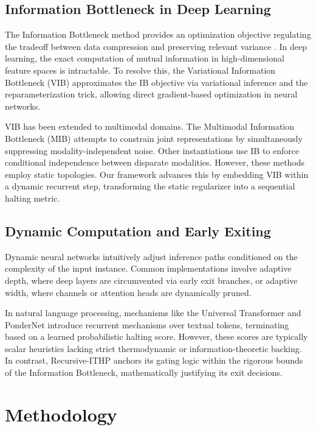 \documentclass[11pt]{article}
\begin{document}
\subsection{Information Bottleneck in Deep Learning}
The Information Bottleneck method provides an optimization objective regulating the tradeoff between data compression and preserving relevant variance \citep{tishby1999information, tishby2015deep}. In deep learning, the exact computation of mutual information in high-dimensional feature spaces is intractable. To resolve this, the Variational Information Bottleneck (VIB) \citep{alemi2016deep} approximates the IB objective via variational inference and the reparameterization trick, allowing direct gradient-based optimization in neural networks.

VIB has been extended to multimodal domains. The Multimodal Information Bottleneck (MIB) attempts to constrain joint representations by simultaneously suppressing modality-independent noise. Other instantiations use IB to enforce conditional independence between disparate modalities. However, these methods employ static topologies. Our framework advances this by embedding VIB within a dynamic recurrent step, transforming the static regularizer into a sequential halting metric.

\subsection{Dynamic Computation and Early Exiting}
Dynamic neural networks intuitively adjust inference paths conditioned on the complexity of the input instance. Common implementations involve adaptive depth, where deep layers are circumvented via early exit branches, or adaptive width, where channels or attention heads are dynamically pruned.

In natural language processing, mechanisms like the Universal Transformer and PonderNet introduce recurrent mechanisms over textual tokens, terminating based on a learned probabilistic halting score. However, these scores are typically scalar heuristics lacking strict thermodynamic or information-theoretic backing. In contrast, Recursive-ITHP anchors its gating logic within the rigorous bounds of the Information Bottleneck, mathematically justifying its exit decisions.

\section{Methodology}
\label{sec:method}
\end{document}
